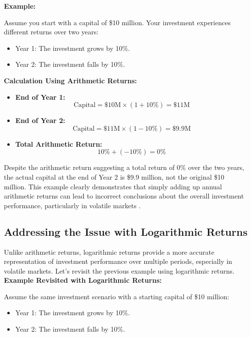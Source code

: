 \documentclass{article}
\begin{document}
\textbf{Example:}

Assume you start with a capital of \$10 million. Your investment experiences different returns over two years:

\begin{itemize}
    \item Year 1: The investment grows by 10\%.
    \item Year 2: The investment falls by 10\%.
\end{itemize}

\textbf{Calculation Using Arithmetic Returns:}

\begin{itemize}
    \item \textbf{End of Year 1:}
      \[ \text{Capital} = \$10\text{M} \times (1 + 10\%) = \$11\text{M} \]
    \item \textbf{End of Year 2:}
      \[ \text{Capital} = \$11\text{M} \times (1 - 10\%) = \$9.9\text{M} \]
    \item \textbf{Total Arithmetic Return:}
      \[ 10\% + (-10\%) = 0\% \]
\end{itemize}

Despite the arithmetic return suggesting a total return of 0\% over the two years, the actual capital at the end of Year 2 is \$9.9 million, not the original \$10 million. This example clearly demonstrates that simply adding up annual arithmetic returns can lead to incorrect conclusions about the overall investment performance, particularly in volatile markets \cite{campbell1988dividend}.

\subsection{Addressing the Issue with Logarithmic Returns}

Unlike arithmetic returns, logarithmic returns provide a more accurate representation of investment performance over multiple periods, especially in volatile markets. Let's revisit the previous example using logarithmic returns. \\

\textbf{Example Revisited with Logarithmic Returns:}

Assume the same investment scenario with a starting capital of \$10 million:

\begin{itemize}
    \item Year 1: The investment grows by 10\%.
    \item Year 2: The investment falls by 10\%.
\end{itemize}
\end{document}
